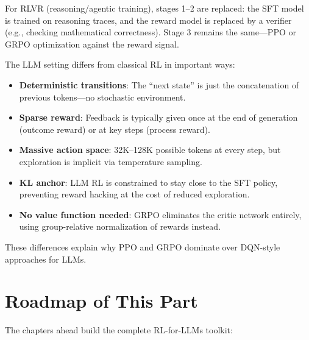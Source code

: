 For RLVR (reasoning/agentic training), stages 1--2 are replaced: the SFT model is trained on reasoning traces, and the reward model is replaced by a verifier (e.g., checking mathematical correctness). Stage 3 remains the same---PPO or GRPO optimization against the reward signal.

\begin{intuitionbox}
The LLM setting differs from classical RL in important ways:

\begin{itemize}
  \item \textbf{Deterministic transitions}: The ``next state'' is just the concatenation of previous tokens---no stochastic environment.
  \item \textbf{Sparse reward}: Feedback is typically given once at the end of generation (outcome reward) or at key steps (process reward).
  \item \textbf{Massive action space}: 32K--128K possible tokens at every step, but exploration is implicit via temperature sampling.
  \item \textbf{KL anchor}: LLM RL is constrained to stay close to the SFT policy, preventing reward hacking at the cost of reduced exploration.
  \item \textbf{No value function needed}: GRPO eliminates the critic network entirely, using group-relative normalization of rewards instead.
\end{itemize}

These differences explain why PPO and GRPO dominate over DQN-style approaches for LLMs.
\end{intuitionbox}

\section{Roadmap of This Part}
\label{what-this-part-covers}

The chapters ahead build the complete RL-for-LLMs toolkit:

